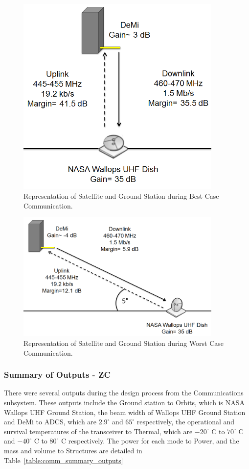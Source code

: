\documentclass[12pt]{article}
\begin{document}
\begin{figure}[ht]
\centering
  \includegraphics[width=4in]{images/comm-best.png}
\caption{Representation of Satellite and Ground Station during Best Case Communication.}
\label{fig:comm_best}
\end{figure}

\begin{figure}[ht]
\centering
  \includegraphics[width=4in]{images/comm-worst.png}
\caption{Representation of Satellite and Ground Station during Worst Case Communication.}
\label{fig:comm_worst}
\end{figure}

			\subsubsection{Summary of Outputs - ZC}

There were several outputs during the design process from the Communications subsystem. These outputs include the Ground station to Orbits, which is NASA Wallops UHF Ground Station, the beam width of Wallops UHF Ground Station and DeMi to ADCS, which are $2.9^\circ$ and $65^\circ$ respectively, the operational and survival temperatures of the transceiver to Thermal, which are $-20^\circ$ C to $70^\circ$ C and $-40^\circ$ C to $80^\circ$ C respectively. The power for each mode to Power, and the mass and volume to Structures are detailed in Table~\ref{table:comm_summary_outputs}
\end{document}
